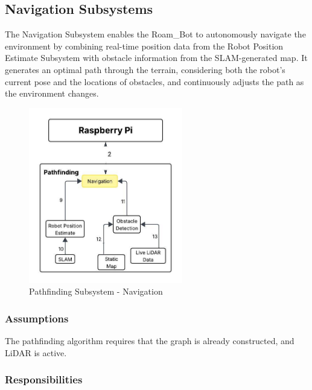 \subsection{Navigation Subsystems}
The Navigation Subsystem enables the Roam\_Bot to autonomously navigate the environment by combining real-time position data from the Robot Position Estimate Subsystem with obstacle information from the SLAM-generated map. It generates an optimal path through the terrain, considering both the robot's current pose and the locations of obstacles, and continuously adjusts the path as the environment changes.
\begin{figure}[h!]
	\centering
 	\includegraphics[width=0.60\textwidth]{images/pathfinding 2/Data_Flow_Navigation.jpeg}
 \caption{Pathfinding Subsystem - Navigation} %
\end{figure}

\subsubsection{Assumptions}

The pathfinding algorithm requires that the graph is already constructed, and LiDAR is active.
\subsubsection{Responsibilities}

